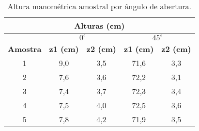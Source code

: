\begin{table}[H]
\centering
\caption{Altura manométrica amostral por ângulo de abertura.}
\label{t:alturas}
\begin{tabular}{|c|c|c|c|c|}
\hline
\multicolumn{5}{|c|}{\textbf{Alturas (cm)}}                                                           \\ \hline
\textbf{}        & \multicolumn{2}{c|}{\textbf{$0^\circ$}} & \multicolumn{2}{c|}{\textbf{$45^\circ$}} \\ \hline
\textbf{Amostra} & \textbf{z1 (cm)}   & \textbf{z2 (cm)}   & \textbf{z1 (cm)}    & \textbf{z2 (cm)}   \\ \hline
1                & 9,0                & 3,5                & 71,6                & 3,3                \\ \hline
2                & 7,6                & 3,6                & 72,2                & 3,1                \\ \hline
3                & 7,4                & 3,7                & 72,3                & 3,4                \\ \hline
4                & 7,5                & 4,0                & 72,5                & 3,6                \\ \hline
5                & 7,8                & 4,2                & 71,9                & 3,5                \\ \hline
\end{tabular}
\end{table}


